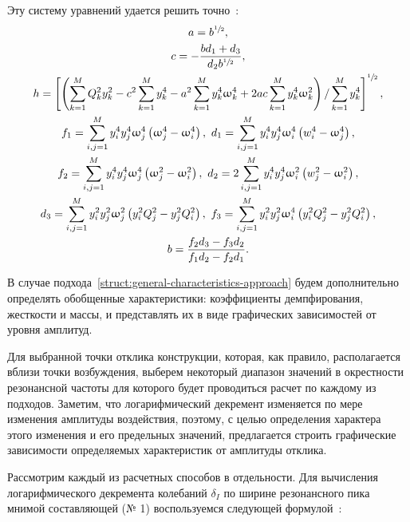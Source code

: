 Эту систему уравнений удается решить точно~\cite{lib:ema:Berns:general}:
\begin{equation}
	\begin{gathered}
		a = b ^ {\sfrac{1}{2}}, \\
		c = -\frac{b d_1 + d_3}{d_2 b ^ {\sfrac{1}{2}}}, \\
		h = \left[ \left( \sum_{k = 1} ^ M Q_k ^ 2 y_k ^ 2 - c ^ 2 \sum_{k = 1} ^ M y_k ^ 4 - a ^ 2 \sum_{k = 1} ^ M y_k ^ 4 \upomega_k ^ 4 + 2 a c \sum_{k = 1} ^ M y_k ^ 4 \upomega_k ^ 2 \right) / \sum_{k = 1} ^ M y_k ^ 4 \right] ^ {\sfrac{1}{2}}, \\ 
		f_1 = \sum_{i, j = 1} ^ M y_i ^ 4 y_j ^ 4 \upomega_j ^ 4 \left( \upomega_j ^ 4 - \upomega_i ^ 4 \right), \ d_1 = \sum_{i, j = 1} ^ M y_i ^ 4 y_j ^ 4 \upomega_i ^ 4 \left( w_i ^ 4 - \upomega_j ^ 4 \right), \\
		f_2 = \sum_{i, j = 1} ^ M y_i ^ 4 y_j ^ 4 \upomega_j ^ 4 \left( \upomega_j ^ 2 - \upomega_i ^ 2 \right), \ d_2 = 2 \sum_{i, j = 1} ^ M y_i ^ 4 y_j ^ 4 \upomega_i ^ 2 \left( w_j ^ 2 - \upomega_i ^ 2 \right), \\
		d_3 = \sum_{i, j = 1} ^ M y_i ^ 2 y_j ^ 2 \upomega_j ^ 2 \left( y_i ^ 2 Q_j ^ 2 - y_j ^ 2 Q_i ^ 2 \right), \ f_3 = \sum_{i, j = 1} ^ M y_i ^ 2 y_j ^ 2 \upomega_i ^ 4 \left( y_i ^ 2 Q_j ^ 2 - y_j ^ 2 Q_i ^ 2 \right), \\
		b = \frac{f_2 d_3 - f_3 d_2}{f_1 d_2 - f_2 d_1}.
	\end{gathered}
	\label{eq:generalModalSolution}
\end{equation}

В случае подхода~\ref{struct:general-characteristics-approach} будем дополнительно определять обобщенные характеристики: коэффициенты демпфирования, жесткости и массы, и представлять их в виде графических зависимостей от уровня амплитуд.

Для выбранной точки отклика конструкции, которая, как правило, располагается вблизи точки возбуждения, выберем некоторый диапазон значений в окрестности резонансной частоты для которого будет проводиться расчет по каждому из подходов. Заметим, что логарифмический декремент изменяется по мере изменения амплитуды воздействия, поэтому, с целью определения характера этого изменения и его предельных значений, предлагается
строить графические зависимости определяемых характеристик от амплитуды отклика.

Рассмотрим каждый из расчетных способов в отдельности. Для вычисления логарифмического декремента колебаний $ \delta_I $ по ширине резонансного пика мнимой составляющей (№ 1) воспользуемся следующей формулой~\cite{lib:aprobation:Moskalik}:

